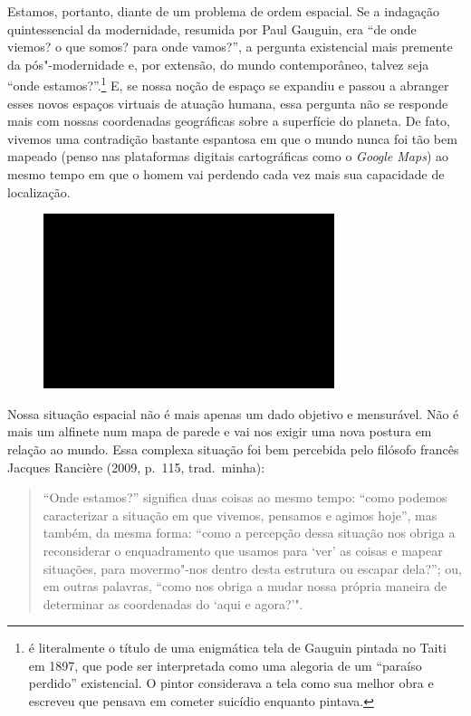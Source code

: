Estamos, portanto, diante de um problema de ordem espacial. Se a
indagação quintessencial da modernidade, resumida por Paul Gauguin, era
``de onde viemos? o que somos? para onde vamos?'', a pergunta
existencial mais premente da pós"-modernidade e, por extensão, do mundo
contemporâneo, talvez seja ``onde estamos?''.\footnote{{} é literalmente o título de uma
  enigmática tela de Gauguin pintada no Taiti em 1897, que pode ser
  interpretada como uma alegoria de um ``paraíso perdido'' existencial.
  O pintor considerava a tela como sua melhor obra e escreveu que
  pensava em cometer suicídio enquanto pintava.} E, se nossa noção de
espaço se expandiu e passou a abranger esses novos espaços virtuais de
atuação humana, essa pergunta não se responde mais com nossas
coordenadas geográficas sobre a superfície do planeta. De fato, vivemos
uma contradição bastante espantosa em que o mundo nunca foi tão bem
mapeado (penso nas plataformas digitais cartográficas como o
\emph{Google Maps}) ao mesmo tempo em que o homem vai perdendo cada vez
mais sua capacidade de localização.

\begin{figure}[!ht]

\centering
 \includegraphics[width=85mm]{./imgs/im1.jpg}
\caption{\tiny{}}

\end{figure}

Nossa situação espacial não é mais apenas um dado objetivo e mensurável.
Não é mais um alfinete num mapa de parede e vai nos exigir uma nova
postura em relação ao mundo. Essa complexa situação foi bem percebida
pelo filósofo francês Jacques Rancière (2009, p.~115, trad.~minha):

\begin{quote}
``Onde estamos?'' significa duas coisas ao mesmo tempo: ``como podemos
caracterizar a situação em que vivemos, pensamos e agimos hoje'', mas
também, da mesma forma: ``como a percepção dessa situação nos obriga a
reconsiderar o enquadramento que usamos para `ver' as coisas e mapear
situações, para movermo"-nos dentro desta estrutura ou escapar dela?'';
ou, em outras palavras, ``como nos obriga a mudar nossa própria maneira
de determinar as coordenadas do `aqui e agora?'".
\end{quote}

